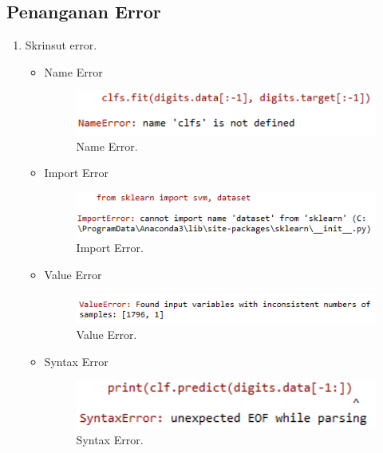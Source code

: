 \subsection{Penanganan Error}
\begin{enumerate}
	\item Skrinsut error.
	\begin{itemize}
		\item Name Error
		\hfill\break
		\begin{figure}[H]
			\includegraphics[width=1\textwidth]{figures/1174006/chapter1/error/err3.png}
			\centering
			\caption{Name Error.}
		\end{figure}
		\item Import Error
		\hfill\break
		\begin{figure}[H]
			\includegraphics[width=1\textwidth]{figures/1174006/chapter1/error/err1.png}
			\centering
			\caption{Import Error.}
		\end{figure}
		\item Value Error
		\hfill\break
		\begin{figure}[H]
			\includegraphics[width=1\textwidth]{figures/1174006/chapter1/error/err2.png}
			\centering
			\caption{Value Error.}
		\end{figure}
		\item Syntax Error
		\hfill\break
		\begin{figure}[H]
			\includegraphics[width=1\textwidth]{figures/1174006/chapter1/error/err4.png}
			\centering
			\caption{Syntax Error.}
		\end{figure}
	\end{itemize}

\end{enumerate}
